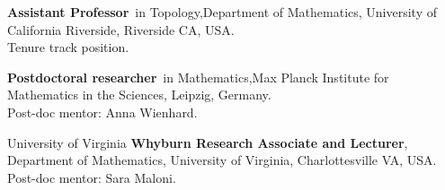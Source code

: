 
{\textbf{Assistant Professor}~in Topology,}{Department of Mathematics, University of California Riverside, Riverside CA, USA.\\ Tenure track position.}

{\textbf{Postdoctoral researcher}~in Mathematics,}{Max Planck Institute for Mathematics in the Sciences, Leipzig, Germany. \\ Post-doc mentor: Anna Wienhard.}

{University of Virginia}
{\textbf{Whyburn Research Associate and Lecturer},}
{Department of Mathematics, University of Virginia, Charlottesville VA, USA. \\
Post-doc mentor: Sara Maloni.}
